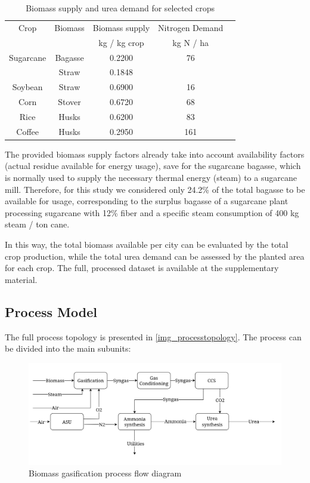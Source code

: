 \documentclass[a4paper, titlepage]{article}
\begin{document}
\begin{table}
	\centering
	\caption{Biomass supply and urea demand for selected crops}
	\label{tab_biomasssupply}
	\begin{tabular}{|c | c | c | c | c|}
		\hline
		Crop & Biomass & Biomass supply \cite{souzaTheoreticalTechnicalAssessment2021} & Nitrogen Demand \cite{IFASTATFertilizerUse} \\
		 & & kg / kg crop & kg N / ha \\
		 \hline
		Sugarcane & Bagasse & 0.2200 & 76 \\ 
		 & Straw & 0.1848 &  \\
		Soybean & Straw & 0.6900 & 16 \\
		Corn & Stover & 0.6720 & 68 \\
		Rice & Husks & 0.6200 & 83 \\
		Coffee & Husks & 0.2950 & 161 \\
		\hline
	\end{tabular}
\end{table}

The provided biomass supply factors already take into account availability factors (actual residue available for energy
usage), save for the sugarcane bagasse, which is normally used to supply the necessary thermal energy (steam)
to a sugarcane mill. Therefore, for this study we considered only 24.2\% of the total bagasse to be available for
usage, corresponding to the surplus bagasse of a sugarcane plant processing sugarcane with 12\% fiber and a specific 
steam consumption of 400 kg steam / ton cane. 

In this way, the total biomass available per city can be evaluated by the total crop production, while the total urea
demand can be assessed by the planted area for each crop. The full, processed dataset is available at the supplementary
material.

\subsection{Process Model}

The full process topology is presented in \autoref{img_processtopology}. The process can be divided into the main subunits:
\begin{figure}
	\includegraphics[width=\textwidth]{img/process_topology.png}
	\caption{Biomass gasification process flow diagram}
	\label{img_processtopology}
\end{figure}
\end{document}
